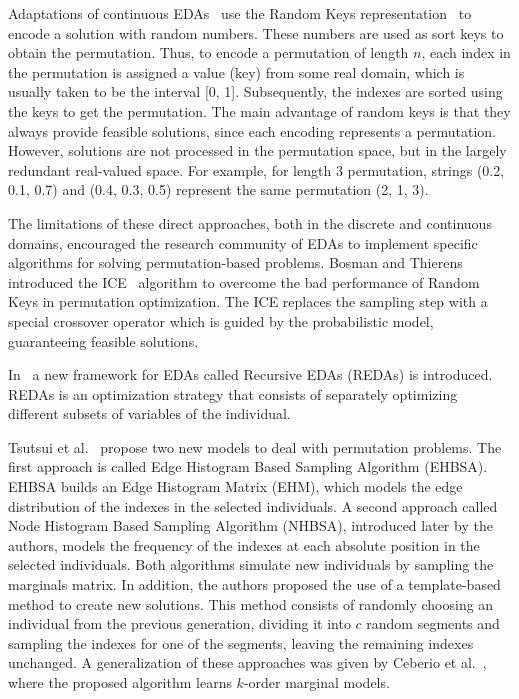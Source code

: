 \documentclass[runningheads]{llncs}
\begin{document}
Adaptations of continuous EDAs~\cite{Bosman01, Robles02,mendiburu} use the Random Keys representation~\cite{DBLP:journals/informs/Bean94} to encode a solution with random numbers. These numbers are used as sort keys to obtain the permutation. Thus, to encode a permutation of length $n$, each index in the permutation is assigned a value (key) from some real domain, which is usually taken to be the interval [0, 1]. Subsequently, the indexes are sorted using the keys to get the permutation. The main advantage of random keys is that they always provide feasible solutions, since each encoding represents a permutation. However, solutions are not processed in the permutation space, but in the largely redundant real-valued space. For example, for length $3$ permutation, strings (0.2, 0.1, 0.7) and (0.4, 0.3, 0.5) represent the same permutation (2, 1, 3).

The limitations of these direct approaches, both in the discrete and continuous domains, encouraged the research community of EDAs to implement specific algorithms for solving permutation-based problems. Bosman and Thierens introduced the ICE~\cite{Bosman01,DBLP:conf/ppsn/BosmanT02} algorithm to overcome the bad performance of Random Keys in permutation optimization. The ICE replaces the sampling step with a special crossover operator which is guided by the probabilistic model, guaranteeing feasible solutions.

In~\cite{DBLP:journals/ijar/RomeroL09} a new framework for EDAs called Recursive EDAs (REDAs) is introduced. REDAs is an optimization strategy that consists of separately optimizing different subsets of variables of the individual.

Tsutsui et al.~\cite{DBLP:conf/ppsn/Tsutsui02,Tsutsui06nodehistogram} propose two new models to deal with permutation problems. The first approach is called Edge Histogram Based Sampling Algorithm (EHBSA). EHBSA builds an Edge Histogram Matrix (EHM), which models the edge distribution of the indexes in the selected individuals. A second approach called Node Histogram Based Sampling Algorithm (NHBSA), introduced later by the authors, models the frequency of the indexes at each absolute position in the selected individuals. Both algorithms simulate new individuals by sampling the marginals matrix. In addition, the authors proposed the use of a template-based method to create new solutions. This method consists of randomly choosing an individual from the previous generation, dividing it into $c$ random segments and sampling the indexes for one of the segments, leaving the remaining indexes unchanged.
A generalization of these approaches was given by Ceberio et al.~\cite{ceberio11a}, where the proposed algorithm learns $k$-order marginal models.
\end{document}
